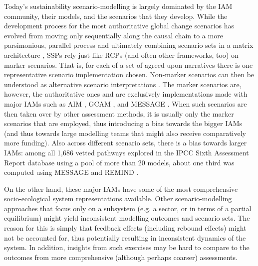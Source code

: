 Today's sustainability scenario-modelling is largely dominated by the IAM community, their models, and the scenarios that they develop. While the development process for the most authoritative global change scenarios has evolved from moving only sequentially along the causal chain to a more parsimonious, parallel process \parencite{moss_2010} and ultimately combining scenario sets in a matrix architecture \parencite{vanvuuren_2014},\footnotemark{} SSPs rely just like RCPs (and often other frameworks, too) on marker scenarios. That is, for each of a set of agreed upon narratives there is one representative scenario implementation chosen. Non-marker scenarios can then be understood as alternative scenario interpretations \parencite{riahi_2017}. The marker scenarios are, however, the authoritative ones and are exclusively implementations made with major IAMs such as AIM \parencite{fujimori_2017}, GCAM \parencite{calvin_2017}, and MESSAGE \parencite{fricko_20171}. When such scenarios are then taken over by other assessment methods, it is usually only the marker scenarios that are employed, thus introducing a bias towards the bigger IAMs (and thus towards large modelling teams that might also receive comparatively more funding). Also across different scenario sets, there is a bias towards larger IAMs: among all 1,686 vetted pathways explored in the IPCC Sixth Assessment Report database using a pool of more than 20 models, about one third was computed using MESSAGE and REMIND \parencite{gambhir_2022,byers_2022}.


On the other hand, these major IAMs have some of the most comprehensive socio-ecological system representations available. Other scenario-modelling approaches that focus only on a subsystem (e.g. a sector, or in terms of a partial equilibrium) might yield inconsistent modelling outcomes and scenario sets. The reason for this is simply that feedback effects (including rebound effects) might not be accounted for, thus potentially resulting in inconsistent dynamics of the system. In addition, insights from such exercises may be hard to compare to the outcomes from more comprehensive (although perhaps coarser) assessments.

